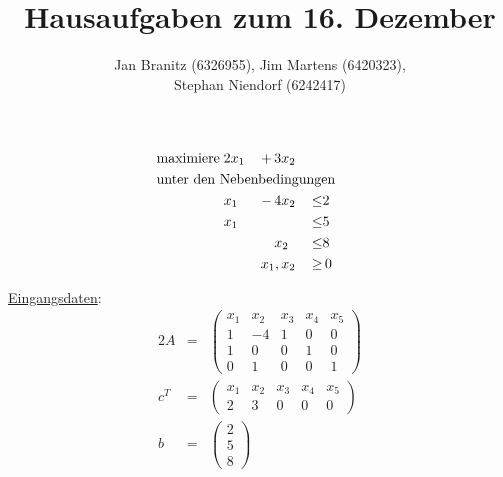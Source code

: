\documentclass[10pt,a4paper,oneside,ngerman,numbers=noenddot]{scrartcl}
\begin{document}
\author{Jan Branitz (6326955), Jim Martens (6420323),\\
Stephan Niendorf (6242417)}
\title{Hausaufgaben zum 16. Dezember}
\maketitle
\section{} %
	\subsection{} %
		\begin{alignat*}{3}
			\text{maximiere}\; & 2x_{1} \,&+&\, 3x_{2} && \\
			\multicolumn{6}{l}{\text{unter den Nebenbedingungen}} && \\
			\;& x_{1} \,&-&\, 4x_{2} \,&\leq & 2 \\
			\;& x_{1} \,&&\, \,&\leq & 5 \\
			\;& \,&&\, x_{2} \,&\leq & 8 \\			
			\multicolumn{4}{r}{$x_{1}, x_{2}$} \,&\geq &\, 0
		\end{alignat*}
		
		\underline{Eingangsdaten}:
		\begin{alignat*}{2}
			A &=& \begin{pmatrix}
				x_{1} & x_{2} & x_{3} & x_{4} & x_{5} \\
				1 & -4 & 1 & 0 & 0 \\
				1 & 0 & 0 & 1 & 0 \\
				0 & 1 & 0 & 0 & 1
			\end{pmatrix} \\
			c^{T} &=& \begin{pmatrix}
				x_{1} & x_{2} & x_{3} & x_{4} & x_{5} \\
				2 & 3 & 0 & 0 & 0
			\end{pmatrix} \\
			b &=& \begin{pmatrix}
				2 \\
				5 \\
				8
			\end{pmatrix}
		\end{alignat*}
\end{document}

